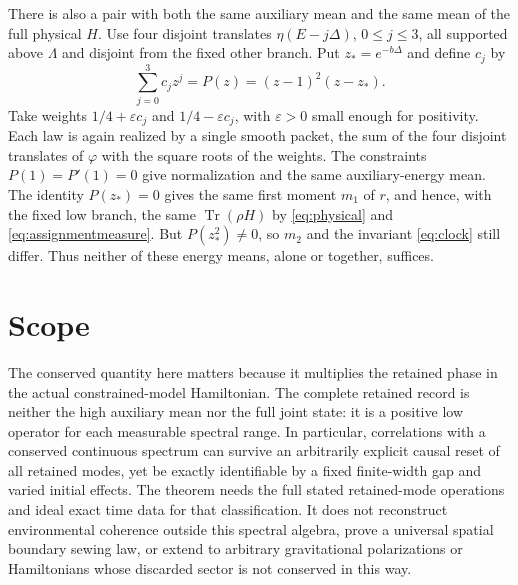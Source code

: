 \documentclass[11pt]{article}
\newcommand{\tr}{\operatorname{Tr}}
\begin{document}
There is also a pair with both the same auxiliary mean and the same mean of the full physical \(H\). Use four disjoint translates \(\eta(E-j\Delta)\), \(0\leq j\leq3\), all supported above \(\Lambda\) and disjoint from the fixed other branch. Put \(z_*=e^{-b\Delta}\) and define \(c_j\) by
\[
 \sum_{j=0}^3 c_j z^j=P(z)=(z-1)^2(z-z_*).
\]
Take weights \(1/4+\varepsilon c_j\) and \(1/4-\varepsilon c_j\), with \(\varepsilon>0\) small enough for positivity. Each law is again realized by a single smooth packet, the sum of the four disjoint translates of \(\varphi\) with the square roots of the weights. The constraints \(P(1)=P'(1)=0\) give normalization and the same auxiliary-energy mean. The identity \(P(z_*)=0\) gives the same first moment \(m_1\) of \(r\), and hence, with the fixed low branch, the same \(\tr(\rho H)\) by \eqref{eq:physical} and \eqref{eq:assignmentmeasure}. But \(P(z_*^2)\ne0\), so \(m_2\) and the invariant \eqref{eq:clock} still differ. Thus neither of these energy means, alone or together, suffices.

\section{Scope}

The conserved quantity here matters because it multiplies the retained phase in the actual constrained-model Hamiltonian. The complete retained record is neither the high auxiliary mean nor the full joint state: it is a positive low operator for each measurable spectral range. In particular, correlations with a conserved continuous spectrum can survive an arbitrarily explicit causal reset of all retained modes, yet be exactly identifiable by a fixed finite-width gap and varied initial effects. The theorem needs the full stated retained-mode operations and ideal exact time data for that classification. It does not reconstruct environmental coherence outside this spectral algebra, prove a universal spatial boundary sewing law, or extend to arbitrary gravitational polarizations or Hamiltonians whose discarded sector is not conserved in this way.
\end{document}
